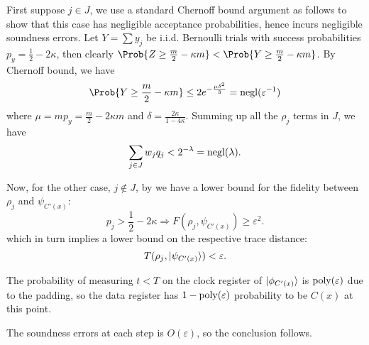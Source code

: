 \begin{prf}
	First suppose $j\in J$, we use a standard Chernoff bound argument as follows to show that this case has negligible acceptance probabilities,
	hence incurs negligible soundness errors.
	Let $Y=\sum y_j$ be i.i.d. Bernoulli trials with success probabilities $p_y=\frac{1}{2}-2\kappa$,
	then clearly $\Prob{Z\geq\frac{m}{2}-\kappa m}<\Prob{Y\geq\frac{m}{2}-\kappa m}$.
	By Chernoff bound, we have
	$$\Prob{Y\geq\frac{m}{2}-\kappa m}\leq2e^{-\frac{\mu\delta^2}{3}}=\negl(\varepsilon^{-1})$$
	where $\mu=mp_y=\frac{m}{2}-2\kappa m$ and $\delta=\frac{2\kappa}{1-4\kappa}$.
	Summing up all the $\rho_j$ terms in $J$, we have
	$$\sum_{j\in J} w_j q_j<2^{-\lambda}=\operatorname{negl}(\lambda).$$

	Now, for the other case, $j\notin J$, by  we have a lower bound for the fidelity between $\rho_j$ and $\psi_{C'(x)}$:
	$$p_j>\frac{1}{2}-2\kappa\Rightarrow F(\rho_j, \psi_{C'(x)})\geq\varepsilon^2.$$
	which in turn implies a lower bound on the respective trace distance:
	$$T(\rho_j, \ket{\psi_{C'(x)}})<\varepsilon.$$

	The probability of measuring $t<T$ on the clock register of $\ket{\phi_{C'(x)}}$ is $\operatorname*{\operatorname{poly}}(\varepsilon)$ due to the padding,
	so the data register has $1-\operatorname*{\operatorname{poly}}(\varepsilon)$ probability to be $C(x)$ at this point.

	The soundness errors at each step is $O(\varepsilon)$, so the conclusion follows.
\end{prf}

